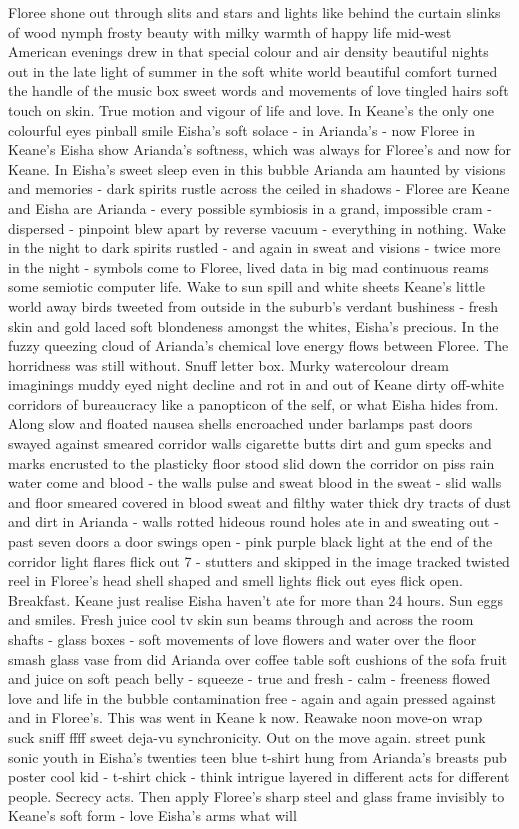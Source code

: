 \documentclass[12pt]{book}
\begin{document}
Floree shone out through slits and stars and lights like behind the curtain slinks of wood nymph frosty beauty with milky warmth of happy life mid-west American evenings drew in that special colour and air density beautiful nights out in the late light of summer in the soft white world beautiful comfort turned the handle of the music box sweet words and movements of love tingled hairs soft touch on skin. True motion and vigour of life and love. In Keane's the only one colourful eyes pinball smile Eisha's soft solace - in Arianda's - now Floree in Keane's Eisha show Arianda's softness, which was always for Floree's and now for Keane. In Eisha's sweet sleep even in this bubble Arianda am haunted by visions and memories - dark spirits rustle across the ceiled in shadows - Floree are Keane and Eisha are Arianda - every possible symbiosis in a grand, impossible cram - dispersed - pinpoint blew apart by reverse vacuum - everything in nothing. Wake in the night to dark spirits rustled - and again in sweat and visions - twice more in the night - symbols come to Floree, lived data in big mad continuous reams some semiotic computer life. Wake to sun spill and white sheets Keane's little world away birds tweeted from outside in the suburb's verdant bushiness - fresh skin and gold laced soft blondeness amongst the whites, Eisha's precious. In the fuzzy queezing cloud of Arianda's chemical love energy flows between Floree. The horridness was still without. Snuff letter box. Murky watercolour dream imaginings muddy eyed night decline and rot in and out of Keane dirty off-white corridors of bureaucracy like a panopticon of the self, or what Eisha hides from. Along slow and floated nausea shells encroached under barlamps past doors swayed against smeared corridor walls cigarette butts dirt and gum specks and marks encrusted to the plasticky floor stood slid down the corridor on piss rain water come and blood - the walls pulse and sweat blood in the sweat - slid walls and floor smeared covered in blood sweat and filthy water thick dry tracts of dust and dirt in Arianda - walls rotted hideous round holes ate in and sweating out - past seven doors a door swings open - pink purple black light at the end of the corridor light flares flick out 7 - stutters and skipped in the image tracked twisted reel in Floree's head shell shaped and smell lights flick out eyes flick open. Breakfast. Keane just realise Eisha haven't ate for more than 24 hours. Sun eggs and smiles. Fresh juice cool tv skin sun beams through and across the room shafts - glass boxes - soft movements of love flowers and water over the floor smash glass vase from did Arianda over coffee table soft cushions of the sofa fruit and juice on soft peach belly - squeeze - true and fresh - calm - freeness flowed love and life in the bubble contamination free - again and again pressed against and in Floree's. This was went in Keane k now. Reawake noon move-on wrap suck sniff ffff sweet deja-vu synchronicity. Out on the move again. street punk sonic youth in Eisha's twenties teen blue t-shirt hung from Arianda's breasts pub poster cool kid - t-shirt chick - think intrigue layered in different acts for different people. Secrecy acts. Then apply Floree's sharp steel and glass frame invisibly to Keane's soft form - love Eisha's arms what will 
\end{document}
